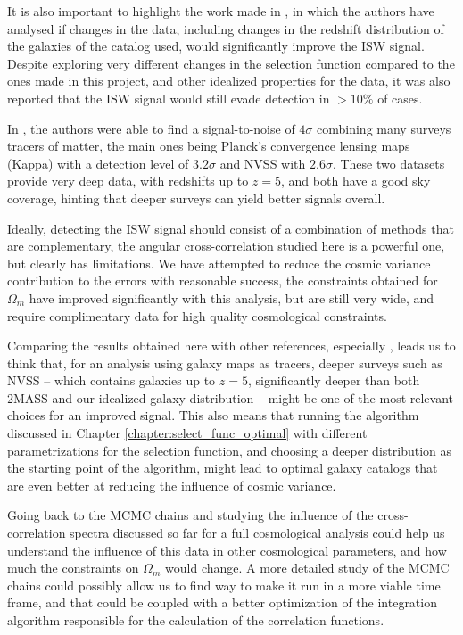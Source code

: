 \documentclass[openany,a4paper,12pt,oneside]{book}
\begin{document}
\begin{spacing}{1.5}
It is also important to highlight the work made in \cite{simillar_ISW_analysis}, in which the authors have analysed if changes in the data, including changes in the redshift distribution of the galaxies of the catalog used, would significantly improve the ISW signal. Despite exploring very different changes in the selection function compared to the ones made in this project, and other idealized properties for the data, it was also reported that the ISW signal would still evade detection in $>10\%$ of cases.

In \cite{cross_corr:Planck}, the authors were able to find a signal-to-noise of $4\sigma$ combining many surveys tracers of matter, the main ones being Planck's convergence lensing maps (Kappa) with a detection level of $3.2\sigma$ and NVSS with $2.6\sigma$. These two datasets provide very deep data, with redshifts up to $z=5$, and both have a good sky coverage, hinting that deeper surveys can yield better signals overall.

Ideally, detecting the ISW signal should consist of a combination of methods that are complementary, the angular cross-correlation studied here is a powerful one, but clearly has limitations. We have attempted to reduce the cosmic variance contribution to the errors with reasonable success, the constraints obtained for $\Omega_m$ have improved significantly with this analysis, but are still very wide, and require complimentary data for high quality cosmological constraints. 

Comparing the results obtained here with other references, especially \cite{cross_corr:Planck}, leads us to think that, for an analysis using galaxy maps as tracers, deeper surveys such as NVSS -- which contains galaxies up to $z=5$, significantly deeper than both 2MASS and our idealized galaxy distribution -- might be one of the most relevant choices for an improved signal. This also means that running the algorithm discussed in Chapter \ref{chapter:select_func_optimal} with different parametrizations for the selection function, and choosing a deeper distribution as the starting point of the algorithm, might lead to optimal galaxy catalogs that are even better at reducing the influence of cosmic variance.

Going back to the MCMC chains and studying the influence of the cross-correlation spectra discussed so far for a full cosmological analysis could help us understand the influence of this data in other cosmological parameters, and how much the constraints on $\Omega_m$ would change. A more detailed study of the MCMC chains could possibly allow us to find way to make it run in a more viable time frame, and that could be coupled with a better optimization of the integration algorithm responsible for the calculation of the correlation functions.


\end{spacing}
\end{document}
